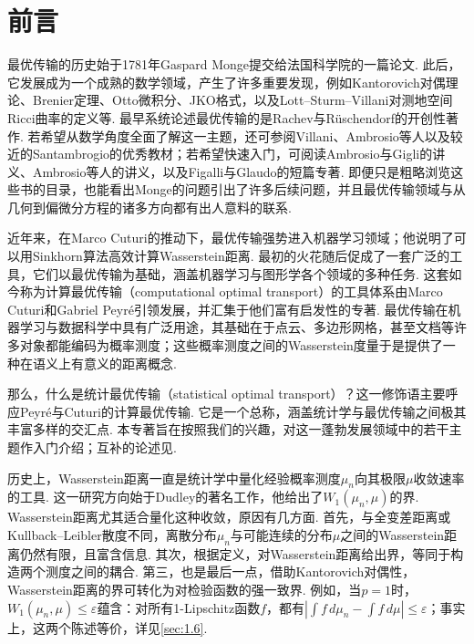\clearpage
{}
\section*{前言}\label{sec:preface}

最优传输的历史始于1781年Gaspard Monge提交给法国科学院的一篇论文\cite{ref231}. 此后，它发展成为一个成熟的数学领域，产生了许多重要发现，例如Kantorovich对偶理论、Brenier定理、Otto微积分、JKO格式，以及Lott--Sturm--Villani对测地空间Ricci曲率的定义等. 最早系统论述最优传输的是Rachev与Rüschendorf的开创性著作\cite{ref267,ref268}. 若希望从数学角度全面了解这一主题，还可参阅Villani\cite{ref315,ref317}、Ambrosio等人\cite{ref18}以及较近的Santambrogio\cite{ref281}的优秀教材；若希望快速入门，可阅读Ambrosio与Gigli的讲义\cite{ref17}、Ambrosio等人的讲义\cite{ref20}，以及Figalli与Glaudo的短篇专著\cite{ref133}. 即便只是粗略浏览这些书的目录，也能看出Monge的问题引出了许多后续问题，并且最优传输领域与从几何到偏微分方程的诸多方向都有出人意料的联系.

近年来，在Marco Cuturi的推动下，最优传输强势进入机器学习领域；他说明了可以用Sinkhorn算法高效计算Wasserstein距离\cite{ref97}. 最初的火花随后促成了一套广泛的工具，它们以最优传输为基础，涵盖机器学习与图形学各个领域的多种任务. 这套如今称为计算最优传输（computational optimal transport）的工具体系由Marco Cuturi和Gabriel Peyré引领发展，并汇集于他们富有启发性的专著\cite{ref257}. 最优传输在机器学习与数据科学中具有广泛用途，其基础在于点云、多边形网格，甚至文档等许多对象都能编码为概率测度；这些概率测度之间的Wasserstein度量于是提供了一种在语义上有意义的距离概念.

那么，什么是统计最优传输（statistical optimal transport）？这一修饰语主要呼应Peyré与Cuturi的计算最优传输. 它是一个总称，涵盖统计学与最优传输之间极其丰富多样的交汇点. 本专著旨在按照我们的兴趣，对这一蓬勃发展领域中的若干主题作入门介绍；互补的论述见\cite{ref253}.

历史上，Wasserstein距离一直是统计学中量化经验概率测度$\mu_n$向其极限$\mu$收敛速率的工具. 这一研究方向始于Dudley的著名工作\cite{ref121}，他给出了$W_1(\mu_n,\mu)$的界. Wasserstein距离尤其适合量化这种收敛，原因有几方面. 首先，与全变差距离或Kullback--Leibler散度不同，离散分布$\mu_n$与可能连续的分布$\mu$之间的Wasserstein距离仍然有限，且富含信息. 其次，根据定义，对Wasserstein距离给出界，等同于构造两个测度之间的耦合. 第三，也是最后一点，借助Kantorovich对偶性，Wasserstein距离的界可转化为对检验函数的强一致界. 例如，当$p=1$时，$W_1(\mu_n,\mu)\leq\varepsilon$蕴含：对所有1-Lipschitz函数$f$，都有$|\int f\,d\mu_n-\int f\,d\mu|\leq\varepsilon$；事实上，这两个陈述等价，详见\autoref{sec:1.6}.

